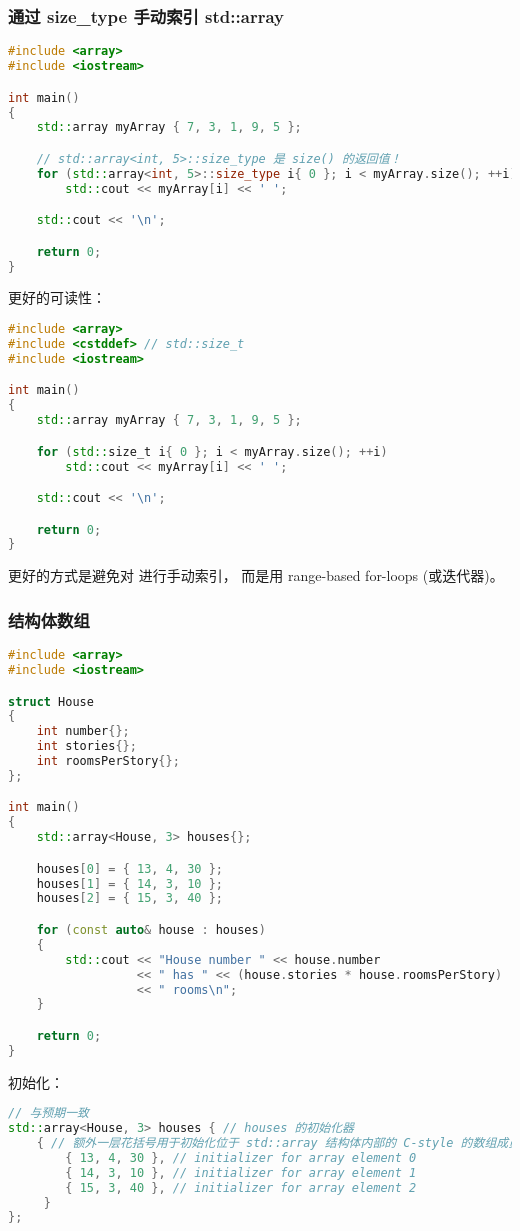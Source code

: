 \documentclass[../../LearnCpp.tex]{subfiles}
\begin{document}
\subsubsection*{通过 size\_type 手动索引 std::array}

\begin{lstlisting}[language=C++]
#include <array>
#include <iostream>

int main()
{
    std::array myArray { 7, 3, 1, 9, 5 };

    // std::array<int, 5>::size_type 是 size() 的返回值！
    for (std::array<int, 5>::size_type i{ 0 }; i < myArray.size(); ++i)
        std::cout << myArray[i] << ' ';

    std::cout << '\n';

    return 0;
}
\end{lstlisting}

更好的可读性：

\begin{lstlisting}[language=C++]
#include <array>
#include <cstddef> // std::size_t
#include <iostream>

int main()
{
    std::array myArray { 7, 3, 1, 9, 5 };

    for (std::size_t i{ 0 }; i < myArray.size(); ++i)
        std::cout << myArray[i] << ' ';

    std::cout << '\n';

    return 0;
}
\end{lstlisting}

更好的方式是避免对  进行手动索引，
而是用 range-based for-loops (或迭代器)。

\subsubsection*{结构体数组}

\begin{lstlisting}[language=C++]
#include <array>
#include <iostream>

struct House
{
    int number{};
    int stories{};
    int roomsPerStory{};
};

int main()
{
    std::array<House, 3> houses{};

    houses[0] = { 13, 4, 30 };
    houses[1] = { 14, 3, 10 };
    houses[2] = { 15, 3, 40 };

    for (const auto& house : houses)
    {
        std::cout << "House number " << house.number
                  << " has " << (house.stories * house.roomsPerStory)
                  << " rooms\n";
    }

    return 0;
}
\end{lstlisting}

初始化：

\begin{lstlisting}[language=C++]
// 与预期一致
std::array<House, 3> houses { // houses 的初始化器
    { // 额外一层花括号用于初始化位于 std::array 结构体内部的 C-style 的数组成员
        { 13, 4, 30 }, // initializer for array element 0
        { 14, 3, 10 }, // initializer for array element 1
        { 15, 3, 40 }, // initializer for array element 2
     }
};
\end{lstlisting}
\end{document}
